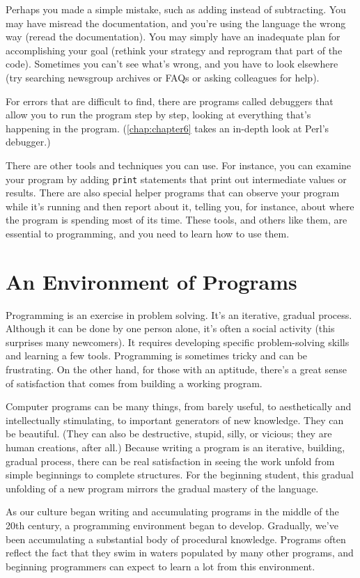 Perhaps you made a simple mistake, such as adding instead of subtracting. You may have misread the documentation, and you're using the language the wrong way (reread the documentation). You may simply have an inadequate plan for accomplishing your goal (rethink your strategy and reprogram that part of the code). Sometimes you can't see what's wrong, and you have to look elsewhere (try searching newsgroup archives or FAQs or asking colleagues for help).

For errors that are difficult to find, there are programs called debuggers that allow you to run the program step by step, looking at everything that's happening in the program. (\ref{chap:chapter6} takes an in-depth look at Perl's debugger.)

There are other tools and techniques you can use. For instance, you can examine your program by adding \verb|print| statements that print out intermediate values or results. There are also special helper programs that can observe your program while it's running and then report about it, telling you, for instance, about where the program is spending most of its time. These tools, and others like them, are essential to programming, and you need to learn how to use them. 

\section{An Environment of Programs}
Programming is an exercise in problem solving. It's an iterative, gradual process. Although it can be done by one person alone, it's often a social activity (this surprises many newcomers). It requires developing specific problem-solving skills and learning a few tools. Programming is sometimes tricky and can be frustrating. On the other hand, for those with an aptitude, there's a great sense of satisfaction that comes from building a working program.

Computer programs can be many things, from barely useful, to aesthetically and intellectually stimulating, to important generators of new knowledge. They can be beautiful. (They can also be destructive, stupid, silly, or vicious; they are human creations, after all.) Because writing a program is an iterative, building, gradual process, there can be real satisfaction in seeing the work unfold from simple beginnings to complete structures. For the beginning student, this gradual unfolding of a new program mirrors the gradual mastery of the language.

As our culture began writing and accumulating programs in the middle of the 20th century, a programming environment began to develop. Gradually, we've been accumulating a substantial body of procedural knowledge.  Programs often reflect the fact that they swim in waters populated by many other programs, and beginning programmers can expect to learn a lot from this environment.


